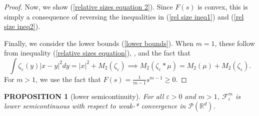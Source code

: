 \documentclass[11pt,leqno]{amsart}
\newtheorem{prop}[thm]{PROPOSITION}
\theoremstyle{definition}
\newcommand{\Rd}{{\mathord{\mathbb R}^d}}
\newcommand{\F}{\mathcal{F}}
\def\P{{\mathcal P}}
\def\e{\varepsilon}
\def\F{\mathcal{F}}
\begin{document}
\begin{proof}
Now, we show (\ref{relative sizes equation 2}). Since $F(s)$ is convex, this is simply a consequence of reversing the inequalities in (\ref{rel size ineq1}) and (\ref{rel size ineq2}).

Finally, we consider the lower bounds (\ref{lower bounds}). When $m=1$, these follow from inequality (\ref{relative sizes equation}), \cite[Lemma 4.1]{CPSW}, and the fact that
\[ \int \zeta_\e(y) |x-y|^2 dy = |x|^2 +M_2(\zeta_\e) \implies M_2(\zeta_\e*\mu) = M_2(\mu) + M_2(\zeta_\e) . \]
For $m>1$, we use the fact that $F(s) = \frac{1}{m-1}s^{m-1} \geq 0$.
\end{proof}



\begin{prop}[lower semicontinuity] \label{lower semicontinuity}
For all $\e >0$ and $m > 1$, $\F^m_\e$ is lower semicontinuous with respect to weak-* convergence in $\P(\Rd)$.
\end{prop}
\end{document}
